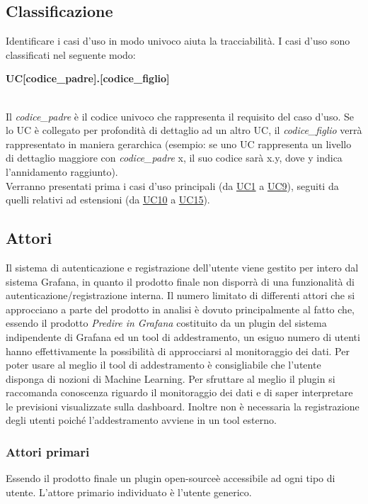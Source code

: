 \subsection{Classificazione}
Identificare i casi d'uso in modo univoco aiuta la tracciabilità. I casi d'uso sono classificati nel seguente modo: \\
\centerline{\textbf{UC[codice\_padre].[codice\_figlio]}} \\
Il \textit{codice\_padre} è il codice univoco che rappresenta il requisito del caso d'uso. Se lo UC è collegato per profondità di dettaglio ad un altro UC, il \textit{codice\_figlio} verrà rappresentato in maniera gerarchica (esempio: se uno UC rappresenta un livello di dettaglio maggiore con \textit{codice\_padre} x, il suo codice sarà x.y, dove y indica l'annidamento raggiunto). \\ Verranno presentati prima i casi d'uso principali (da \hyperref[par:UC1]{UC1} a \hyperref[par:UC9]{UC9}), seguiti da quelli relativi ad estensioni (da \hyperref[par:UC10]{UC10} a \hyperref[par:UC15]{UC15}).

	\subsection{Attori}
Il sistema di autenticazione e registrazione dell'utente viene gestito per intero dal sistema Grafana, in quanto il prodotto finale non disporrà di una funzionalità di autenticazione/registrazione interna.									
Il numero limitato di differenti attori che si approcciano a parte del prodotto in analisi è dovuto principalmente al fatto che, essendo il prodotto \emph{Predire in Grafana} costituito da un plugin del sistema indipendente di Grafana ed un tool di addestramento, un esiguo numero di utenti hanno effettivamente la possibilità di approcciarsi al monitoraggio dei dati.
Per poter usare al meglio il tool di addestramento è consigliabile che l'utente disponga di nozioni di Machine Learning. Per sfruttare al meglio il plugin si raccomanda conoscenza riguardo il monitoraggio dei dati e di saper interpretare le previsioni visualizzate sulla dashboard. 
Inoltre non è necessaria la  registrazione degli utenti poiché l'addestramento avviene in un tool esterno.


	\subsubsection{Attori primari}
Essendo il prodotto finale un plugin open-source\glo è accessibile ad ogni tipo di utente. L'attore primario individuato è l'utente generico.

